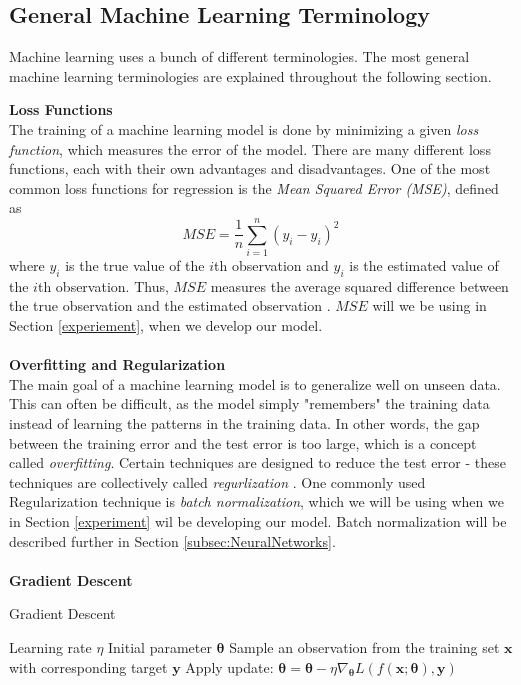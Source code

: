 \documentclass[./main.tex]{subfiles}
\begin{document}
\subsection{General Machine Learning Terminology}\label{subsec:general_ML_terminology}
Machine learning uses a bunch of different terminologies. The most general machine learning terminologies are explained throughout the following section.

\noindent \textbf{Loss Functions} \\
The training of a machine learning model is done by minimizing a given \textit{loss function}, which measures the error of the model. There are many different loss functions, each with their own advantages and disadvantages. One of the most common loss functions for regression is the \textit{Mean Squared Error (MSE)}, defined as
$$MSE = \frac{1}{n} \sum_{i = 1} ^n \left( y_i - \hat{y}_i \right)^2$$
where $y_i$ is the true value of the $i$th observation and $\hat{y}_i$ is the estimated value of the $i$th observation. Thus, $MSE$ measures the average squared difference between the true observation and the estimated observation \cite{ISL}. $MSE$ will we be using in Section \ref{experiement}, when we develop our model.
\\
\\
\noindent \textbf{Overfitting and Regularization} \\
The main goal of a machine learning model is to generalize well on unseen data. This can often be difficult, as the model simply "remembers" the training data instead of learning the patterns in the training data. In other words, the gap between the training error and the test error is too large, which is a concept called \textit{overfitting}. Certain techniques are designed to reduce the test error - these techniques are collectively called \textit{regurlization} \cite{DeepLearning}. One commonly used Regularization technique is \textit{batch normalization}, which we will be using when we in Section \ref{experiment} wil be developing our model. Batch normalization will be described further in Section \ref{subsec:NeuralNetworks}.
\\
\\
\textbf{Gradient Descent}
\begin{algorithm}[htbp]
    \caption{Gradient Descent \cite{d2l}}
    \label{Algorithm:gradient_descent_alg}
    \begin{algorithmic}[1]
        \Require Learning rate $\eta$
        \Require Initial parameter $\bm{\theta}$
            \State Sample an observation from the training set $\bm{x}$ with corresponding target $\bm{y}$
            \State Apply update: $\bm{\theta} = \bm{\theta} - \eta \nabla_{\bm{\theta}} L\left( f(\bm{x}; \bm{\theta}), \bm{y} \right)$
        \EndWhile
    \end{algorithmic}
\end{algorithm}
\end{document}
